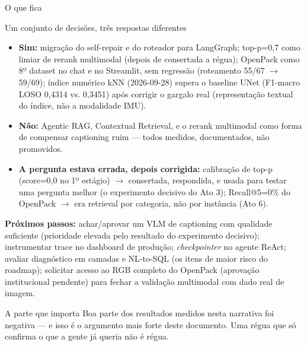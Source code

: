 \documentclass{beamer}
\newenvironment{numerobloco}[1]{\begin{block}{#1}}{\end{block}}
\newenvironment{decisaobloco}[1]{\begin{alertblock}{#1}}{\end{alertblock}}
\begin{document}
\begin{frame}{O que fica}
  \begin{numerobloco}{Um conjunto de decisões, três respostas diferentes}
    \begin{itemize}
      \item \textbf{Sim:} migração do self-repair e do roteador para LangGraph;
        top-p=0,7 como limiar de rerank multimodal (depois de consertada a régua);
        OpenPack como 8º dataset no chat e no Streamlit, sem regressão
        (roteamento 55/67 $\to$ 59/69); índice numérico kNN (2026-09-28) supera o
        baseline UNet (F1-macro LOSO 0,4314 vs. 0,3451) após corrigir o
        gargalo real (representação textual do índice, não a modalidade IMU).
      \item \textbf{Não:} Agentic RAG, Contextual Retrieval, e o rerank multimodal como
        forma de compensar captioning ruim --- todos medidos, documentados, não
        promovidos.
      \item \textbf{A pergunta estava errada, depois corrigida:} calibração de top-p
        (score=0,0 no 1º estágio) $\to$ consertada, respondida, e usada para testar uma
        pergunta melhor (o experimento decisivo do Ato 3); Recall@5=0\% do OpenPack
        $\to$ era retrieval por categoria, não por instância (Ato 6).
    \end{itemize}
  \end{numerobloco}

  \pause
  \textbf{Próximos passos:} achar/aprovar um VLM de captioning com qualidade suficiente
  (prioridade elevada pelo resultado do experimento decisivo); instrumentar trace no
  dashboard de produção; \emph{checkpointer} no agente ReAct; avaliar diagnóstico em
  camadas e NL-to-SQL (os itens de maior risco do roadmap); solicitar acesso ao RGB
  completo do OpenPack (aprovação institucional pendente) para fechar a validação
  multimodal com dado real de imagem.

  \pause
  \begin{decisaobloco}{A parte que importa}
    Boa parte dos resultados medidos nesta narrativa foi negativa --- e isso é o
    argumento mais forte deste documento. Uma régua que só confirma o que a gente já
    queria não é régua.
  \end{decisaobloco}
\end{frame}
\end{document}
